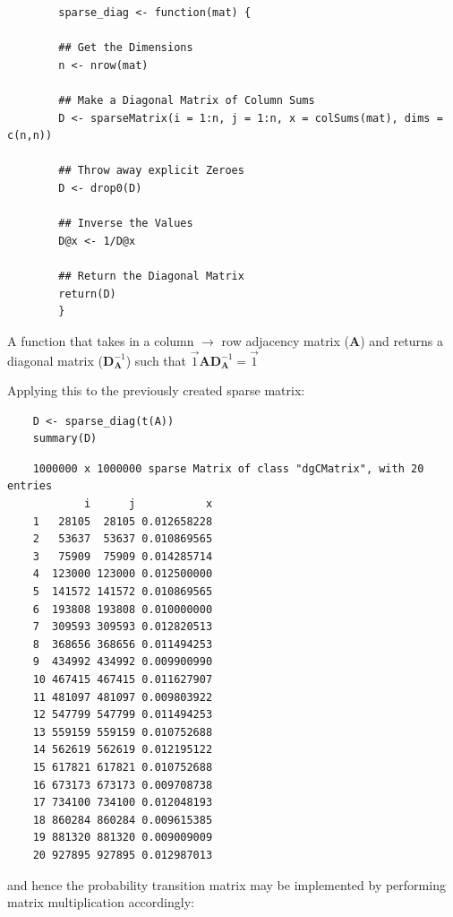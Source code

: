 \documentclass[11pt]{report}
\begin{document}
\begin{listing}[htbp]
    \begin{tcolorbox}
        \begin{verbatim}
        sparse_diag <- function(mat) {

        ## Get the Dimensions
        n <- nrow(mat)

        ## Make a Diagonal Matrix of Column Sums
        D <- sparseMatrix(i = 1:n, j = 1:n, x = colSums(mat), dims = c(n,n))

        ## Throw away explicit Zeroes
        D <- drop0(D)

        ## Inverse the Values
        D@x <- 1/D@x

        ## Return the Diagonal Matrix
        return(D)
        }
        \end{verbatim}
    \end{tcolorbox}
\caption{\label{sparse-diag} A function that takes in a column \(\rightarrow\) row adjacency matrix (\(\mathbf{A}\)) and returns a diagonal matrix (\(\mathbf{D}^{-1}_{\mathbf{A}}\)) such that \(\vec{1}\mathbf{A} \mathbf{D}^{-1}_{\mathbf{A}} = \vec{1}\)}
\end{listing}

Applying this to the previously created sparse matrix:

\begin{tcolorbox}
    \begin{verbatim}
    D <- sparse_diag(t(A))
    summary(D)
    \end{verbatim}
\tcblower
    \begin{verbatim}
    1000000 x 1000000 sparse Matrix of class "dgCMatrix", with 20 entries
            i      j           x
    1   28105  28105 0.012658228
    2   53637  53637 0.010869565
    3   75909  75909 0.014285714
    4  123000 123000 0.012500000
    5  141572 141572 0.010869565
    6  193808 193808 0.010000000
    7  309593 309593 0.012820513
    8  368656 368656 0.011494253
    9  434992 434992 0.009900990
    10 467415 467415 0.011627907
    11 481097 481097 0.009803922
    12 547799 547799 0.011494253
    13 559159 559159 0.010752688
    14 562619 562619 0.012195122
    15 617821 617821 0.010752688
    16 673173 673173 0.009708738
    17 734100 734100 0.012048193
    18 860284 860284 0.009615385
    19 881320 881320 0.009009009
    20 927895 927895 0.012987013
    \end{verbatim}
\end{tcolorbox}

and hence the probability transition matrix may be implemented by performing matrix multiplication accordingly:
\end{document}
